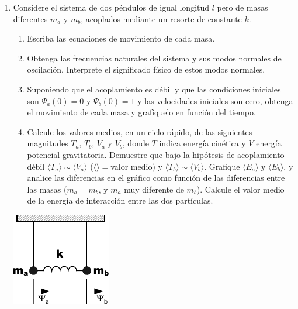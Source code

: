 \documentclass[11pt,spanish,a4paper]{article}
\begin{document}
\begin{enumerate}
\item Considere el sistema de dos péndulos de igual longitud \(l\) pero de masas diferentes \(m_a\) y \(m_b\), acoplados mediante un resorte de constante \(k\).
\begin{enumerate}
	\item Escriba las ecuaciones de movimiento de cada masa.
	\item Obtenga las frecuencias naturales del sistema y sus modos normales de oscilación.
		Interprete el significado físico de estos modos normales.
	\item Suponiendo que el acoplamiento es débil y que las condiciones iniciales son \(\Psi_a(0)= 0\) y \(\Psi_b(0)= 1\) y las velocidades iniciales son cero, obtenga el movimiento de cada masa y grafíquelo en función del tiempo.
	\item Calcule los valores medios, en un ciclo rápido, de las siguientes magnitudes \(T_a\), \(T_b\), \(V_a\) y \(V_b\), donde \(T\) indica energía cinética y \(V\) energía potencial gravitatoria.
		Demuestre que bajo la hipótesis de acoplamiento débil \(\langle T_a \rangle \sim \langle V_a \rangle\) (\(\langle \rangle=\)valor medio) y \(\langle T_b \rangle \sim \langle V_b \rangle \).
		Grafique \(\langle E_a \rangle\) y \(\langle E_b \rangle\), y analice las diferencias en el gráfico como función de las diferencias entre las masas (\(m_a=m_b\), y \(m_a\) muy diferente de \(m_b\)).
		Calcule el valor medio de la energía de interacción entre las dos partículas.
	\end{enumerate}
    \begin{center}
		\includegraphics[width=0.25\linewidth]{g02e10}
	\end{center}


\end{enumerate}
\end{document}
